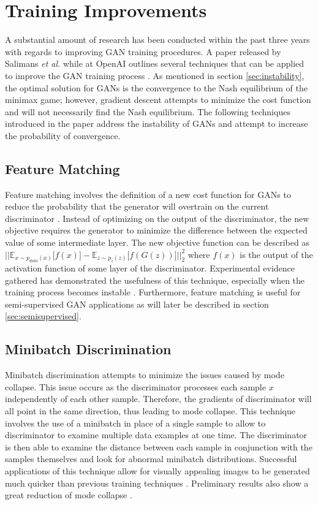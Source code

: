 \documentclass[11pt]{article}
\begin{document}
\section{Training Improvements}
A substantial amount of research has been conducted within the past three years with regards to improving GAN training procedures. A paper released by Salimans \textit{et al.} while at OpenAI outlines several techniques that can be applied to improve the GAN training process \citep{2016arXiv160603498S}. As mentioned in section \ref{sec:instability}, the optimal solution for GANs is the convergence to the Nash equilibrium of the minimax game; however, gradient descent attempts to minimize the cost function and will not necessarily find the Nash equilibrium. The following techniques introduced in the paper address the instability of GANs and attempt to increase the probability of convergence.

\subsection{Feature Matching}
Feature matching involves the definition of a new cost function for GANs to reduce the probability that the generator will overtrain on the current discriminator \citep{2016arXiv160603498S}. Instead of optimizing on the output of the discriminator, the new objective requires the generator to minimize the difference between the expected value of some intermediate layer. The new objective function can be described as $\Big|\Big|\mathbb{E}_{x\sim p_{data}(x)}\Big[f(x)\Big] - \mathbb{E}_{z\sim p_{z}(z)}\Big[f(G(z))\Big]\Big|\Big|_2^2$ where $f(x)$ is the output of the activation function of some layer of the discriminator. Experimental evidence gathered has demonstrated the usefulness of this technique, especially when the training process becomes instable \citep{2016arXiv160603498S}. Furthermore, feature matching is useful for semi-supervised GAN applications as will later be described in section \ref{sec:semisupervised}.

\subsection{Minibatch Discrimination} \label{sec:minidisc}
Minibatch discrimination attempts to minimize the issues caused by mode collapse. This issue occurs as the discriminator processes each sample $x$ independently of each other sample. Therefore, the gradients of discriminator will all point in the same direction, thus leading to mode collapse. This technique involves the use of a minibatch in place of a single sample to allow to discriminator to examine multiple data examples at one time. The discriminator is then able to examine the distance between each sample in conjunction with the samples themselves and look for abnormal minibatch distributions. Successful applications of this technique allow for visually appealing images to be generated much quicker than previous training techniques \citep{2016arXiv160603498S}. Preliminary results also show a great reduction of mode collapse \citep{2017arXiv170100160G}.
\end{document}
